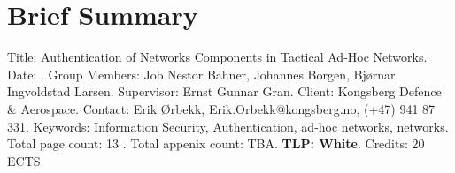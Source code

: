 \chapter*{Brief Summary}


Title: Authentication of Networks Components in Tactical Ad-Hoc Networks.\newline
Date: \ntnuthesisdate . \newline
Group Members: Job Nestor Bahner, 
Johannes Borgen, 
Bjørnar Ingvoldstad Larsen.
Supervisor: Ernst Gunnar Gran.\newline
Client: Kongsberg Defence \& Aerospace.\newline
Contact: Erik Ørbekk, Erik.Orbekk@kongsberg.no, (+47) 941 87 331.\newline
Keywords: Information Security, Authentication, ad-hoc networks, networks.\newline
Total page count: 13 .\newline
Total appenix count: TBA. \newline
\textbf{TLP: White}.\newline
Credits: 20 ECTS.\newline
